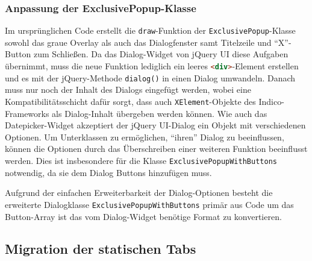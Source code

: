 \subsubsection{Anpassung der ExclusivePopup-Klasse}

Im ursprünglichen Code erstellt die \lstinline{draw}-Funktion der \lstinline{ExclusivePopup}-Klasse
sowohl das graue Overlay als auch das Dialogfenster samt Titelzeile und \enquote{X}-Button zum
Schließen. Da das Dialog-Widget von jQuery UI diese Aufgaben übernimmt, muss die neue Funktion
lediglich ein leeres \lstinline[language=HTML]{<div>}-Element erstellen und es mit der
jQuery-Methode \lstinline{dialog()} in einen Dialog umwandeln. Danach muss nur noch der Inhalt des
Dialogs eingefügt werden, wobei eine Kompatibilitätsschicht dafür sorgt, dass auch
\lstinline{XElement}-Objekte des Indico-Frameworks als Dialog-Inhalt übergeben werden können. Wie
auch das Datepicker-Widget akzeptiert der jQuery UI-Dialog ein Objekt mit verschiedenen Optionen. Um
Unterklassen zu ermöglichen, \enquote{ihren} Dialog zu beeinflussen, können die Optionen durch das
Überschreiben einer weiteren Funktion beeinflusst werden. Dies ist insbesondere für die Klasse
\lstinline{ExclusivePopupWithButtons} notwendig, da sie dem Dialog Buttons hinzufügen muss.

Aufgrund der einfachen Erweiterbarkeit der Dialog-Optionen besteht die erweiterte Dialogklasse
\lstinline{ExclusivePopupWithButtons} primär aus Code um das Button-Array ist das vom Dialog-Widget
benötige Format zu konvertieren.



\subsection{Migration der statischen Tabs}

